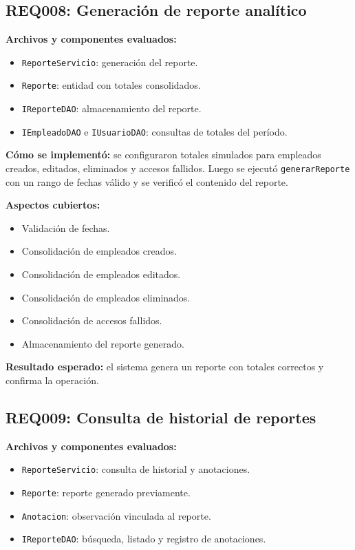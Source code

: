\documentclass[12pt,a4paper]{article}
\begin{document}
\subsection{REQ008: Generación de reporte analítico}

\textbf{Archivos y componentes evaluados:}
\begin{itemize}[leftmargin=*]
    \item \texttt{ReporteServicio}: generación del reporte.
    \item \texttt{Reporte}: entidad con totales consolidados.
    \item \texttt{IReporteDAO}: almacenamiento del reporte.
    \item \texttt{IEmpleadoDAO} e \texttt{IUsuarioDAO}: consultas de totales del período.
\end{itemize}

\textbf{Cómo se implementó:} se configuraron totales simulados para empleados creados, editados, eliminados y accesos fallidos. Luego se ejecutó \texttt{generarReporte} con un rango de fechas válido y se verificó el contenido del reporte.

\textbf{Aspectos cubiertos:}
\begin{itemize}[leftmargin=*]
    \item Validación de fechas.
    \item Consolidación de empleados creados.
    \item Consolidación de empleados editados.
    \item Consolidación de empleados eliminados.
    \item Consolidación de accesos fallidos.
    \item Almacenamiento del reporte generado.
\end{itemize}

\textbf{Resultado esperado:} el sistema genera un reporte con totales correctos y confirma la operación.

\subsection{REQ009: Consulta de historial de reportes}

\textbf{Archivos y componentes evaluados:}
\begin{itemize}[leftmargin=*]
    \item \texttt{ReporteServicio}: consulta de historial y anotaciones.
    \item \texttt{Reporte}: reporte generado previamente.
    \item \texttt{Anotacion}: observación vinculada al reporte.
    \item \texttt{IReporteDAO}: búsqueda, listado y registro de anotaciones.
\end{itemize}
\end{document}
